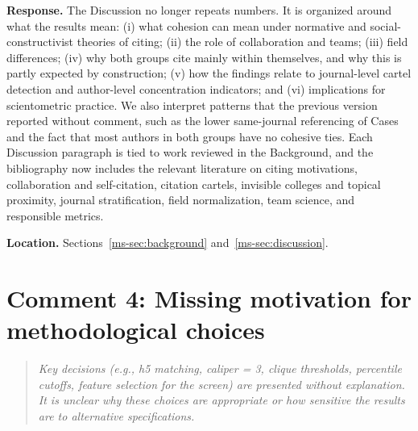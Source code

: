 \documentclass[11pt]{article}
\newcommand{\commenttext}[1]{\begin{quote}\itshape #1\end{quote}}
\newcommand{\response}{\textbf{Response.} }
\newcommand{\location}[1]{\textbf{Location.} #1.}
\begin{document}
\response The Discussion no longer repeats numbers.  It is organized around what the results mean: (i) what cohesion can mean under normative and social-constructivist theories of citing; (ii) the role of collaboration and teams; (iii) field differences; (iv) why both groups cite mainly within themselves, and why this is partly expected by construction; (v) how the findings relate to journal-level cartel detection and author-level concentration indicators; and (vi) implications for scientometric practice.  We also interpret patterns that the previous version reported without comment, such as the lower same-journal referencing of Cases and the fact that most authors in both groups have no cohesive ties.  Each Discussion paragraph is tied to work reviewed in the Background, and the bibliography now includes the relevant literature on citing motivations, collaboration and self-citation, citation cartels, invisible colleges and topical proximity, journal stratification, field normalization, team science, and responsible metrics.

\location{Sections~\ref{ms-sec:background} and~\ref{ms-sec:discussion}}

\section*{Comment 4: Missing motivation for methodological choices}

\commenttext{Key decisions (e.g., h5 matching, caliper = 3, clique thresholds, percentile cutoffs, feature selection for the screen) are presented without explanation. It is unclear why these choices are appropriate or how sensitive the results are to alternative specifications.}
\end{document}
